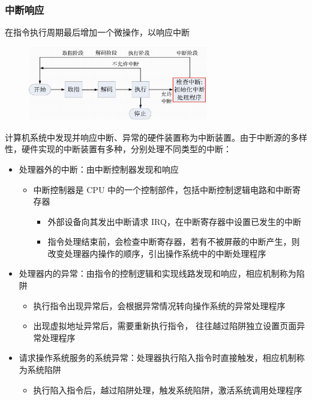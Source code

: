 \documentclass[cs4size,a4paper,10pt]{ctexart}
\begin{document}
	\subsubsection{中断响应}
	在指令执行周期最后增加一个微操作，以响应中断
	\begin{figure}[H]
		\centering
		\includegraphics[width=0.7\textwidth]{img/2.2.3.1}
	\end{figure}
	计算机系统中发现并响应中断、异常的硬件装置称为中断装置。由于中断源的多样性，硬件实现的中断装置有多种，分别处理不同类型的中断：
	\begin{itemize}
		\item 处理器外的中断：由中断控制器发现和响应
		\begin{itemize}
			\item 中断控制器是 CPU 中的一个控制部件，包括中断控制逻辑电路和中断寄存器
			\begin{itemize}
				\item 外部设备向其发出中断请求 IRQ，在中断寄存器中设置已发生的中断
				\item 指令处理结束前，会检查中断寄存器，若有不被屏蔽的中断产生，则改变处理器内操作的顺序，引出操作系统中的中断处理程序
			\end{itemize}
		\end{itemize}
		\item 处理器内的异常：由指令的控制逻辑和实现线路发现和响应，相应机制称为陷阱
		\begin{itemize}
			\item 执行指令出现异常后，会根据异常情况转向操作系统的异常处理程序
			\item 出现虚拟地址异常后，需要重新执行指令， 往往越过陷阱独立设置页面异常处理程序
		\end{itemize}
		\item 请求操作系统服务的系统异常：处理器执行陷入指令时直接触发，相应机制称为系统陷阱
		\begin{itemize}
			\item 执行陷入指令后，越过陷阱处理，触发系统陷阱，激活系统调用处理程序
		\end{itemize}
	\end{itemize}
\end{document}
